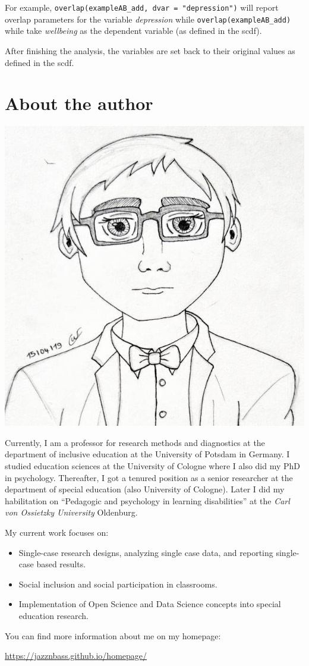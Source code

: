 \documentclass[
  letterpaper,
  DIV=11,
  numbers=noendperiod]{scrreprt}
\providecommand{\tightlist}{%
  \setlength{\itemsep}{0pt}\setlength{\parskip}{0pt}}\usepackage{longtable,booktabs,array}
\begin{document}
For example, \texttt{overlap(exampleAB\_add,\ dvar\ =\ "depression")}
will report overlap parameters for the variable \emph{depression} while
\texttt{overlap(exampleAB\_add)} while take \emph{wellbeing} as the
dependent variable (as defined in the scdf).

After finishing the analysis, the variables are set back to their
original values as defined in the scdf.

\hypertarget{about-the-author}{%
\chapter{About the author}\label{about-the-author}}

\includegraphics{./images/wilbert3.jpg}

Currently, I am a professor for research methods and diagnostics at the
department of inclusive education at the University of Potsdam in
Germany. I studied education sciences at the University of Cologne where
I also did my PhD in psychology. Thereafter, I got a tenured position as
a senior researcher at the department of special education (also
University of Cologne). Later I did my habilitation on ``Pedagogic and
psychology in learning disabilities'' at the \emph{Carl von Ossietzky
University} Oldenburg.

My current work focuses on:

\begin{itemize}
\tightlist
\item
  Single-case research designs, analyzing single case data, and
  reporting single-case based results.
\item
  Social inclusion and social participation in classrooms.
\item
  Implementation of Open Science and Data Science concepts into special
  education research.
\end{itemize}

You can find more information about me on my homepage:

\url{https://jazznbass.github.io/homepage/}
\end{document}
